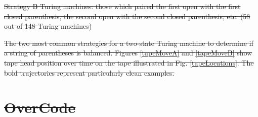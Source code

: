 \documentclass[12pt,twoside]{mitthesis}
\providecommand{\DIFdeltex}[1]{{\protect\color{red}\sout{#1}}}                      %
\providecommand{\DIFdelFL}[1]{\DIFdel{#1}} %
\providecommand{\DIFdel}[1]{\texorpdfstring{\DIFdeltex{#1}}{}} %
\begin{document}
{%
\DIFdelFL{Strategy B Turing machines: those which paired the first open with the first closed parenthesis, the second open with the second closed parenthesis, etc. (58 out of 148 Turing machines)}}


{%
\DIFdelFL{The two most common strategies for a two-state Turing machine to determine if a string of parentheses is balanced. Figures \ref{tapeMoveA} and \ref{tapeMoveB} show tape head position over time on the tape illustrated in Fig. \ref{tapeLocations}. The bold trajectories represent particularly clean examples.}}

\section{\DIFdel{OverCode}}
\addtocounter{section}{-1}%
\end{document}
